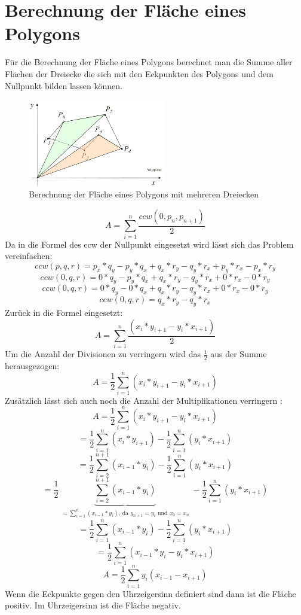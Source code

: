 \documentclass[conference]{IEEEtran}
\begin{document}
	\section{Berechnung der Fläche eines Polygons}
	Für die Berechnung der Fläche eines Polygons berechnet man die Summe aller Flächen der Dreiecke die sich mit den Eckpunkten des Polygons und dem Nullpunkt bilden lassen können.
	\begin{figure}[h]
		\begin{center}
			\includegraphics[width=6cm]{AreaPoly.png}
			\caption{Berechnung der Fläche eines Polygons mit mehreren Dreiecken}
			\label{figure_3}
		\end{center}
	\end{figure}
	\[ A = \sum_{i=1}^{n} \frac{ccw(0,p_n,p_{n+1})}{2} \]
	Da in die Formel des ccw der Nullpunkt eingesetzt wird lässt sich das Problem vereinfachen:
	\[ ccw(p,q,r) = p_x*q_y - p_y*q_x + q_x*r_y - q_y*r_x + p_y*r_x - p_x*r_y \]
	\[ ccw(0,q,r) = 0*q_y - p_y*q_x + q_x*r_y - q_y*r_x + 0*r_x - 0*r_y \]
	\[ ccw(0,q,r) = 0*q_y - 0*q_x + q_x*r_y - q_y*r_x + 0*r_x - 0*r_y \]
	\[ ccw(0,q,r) =  q_x*r_y - q_y*r_x  \]
	Zurück in die Formel eingesetzt:
	\[ A = \sum_{i=1}^{n} \frac{(x_{i}*y_{i+1}-y_{i}*x_{i+1})}{2}\]
	Um die Anzahl der Divisionen zu verringern wird das $\frac{1}{2}$ aus der Summe herausgezogen:
	\[ A= \frac{1}{2}\sum_{i=1}^{n}(x_{i}*y_{i+1}-y_{i}*x_{i+1})\]
	Zusätzlich lässt sich auch noch die Anzahl der Multiplikationen verringern \cite{b1}:
	\[ A = \frac{1}{2}\sum_{i=1}^{n}(x_{i}*y_{i+1}-y_{i}*x_{i+1})\]	
	\[ = \frac{1}{2}\sum_{i=1}^{n}(x_{i}*y_{i+1}) - \frac{1}{2}\sum_{i=1}^{n}(y_{i}*x_{i+1})\]	
	\[ = \frac{1}{2}\sum_{i=2}^{n+1}(x_{i-1}*y_{i}) - \frac{1}{2}\sum_{i=1}^{n}(y_{i}*x_{i+1})\]
	\[ = \frac{1}{2} \underbrace{\sum_{i=2}^{n+1}(x_{i-1}*y_i)}_{\substack{ = \sum_{i=1}^{n}(x_{i-1}*y_{i})  \text{, da } y_{n+1}=y_i \text{ und } x_0=x_n}} - \frac{1}{2}\sum_{i=1}^{n}(y_i*x_{i+1})\]
	\[ = \frac{1}{2} \sum_{i=1}^{n}(x_{i-1}*y_{i}) - \frac{1}{2}\sum_{i=1}^{n}(y_i*x_{i+1})\]
	\[ = \frac{1}{2}\sum_{i=1}^{n}(x_{i-1}*y_{i}-y_{i}*x_{i+1})\]
	\[ A= \frac{1}{2}\sum_{i=1}^{n} y_i(x_{i-1}-x_{i+1})\]
	Wenn die Eckpunkte gegen den Uhrzeigersinn definiert sind dann ist die Fläche positiv. Im Uhrzeigersinn ist die Fläche negativ.
	
\end{document}
